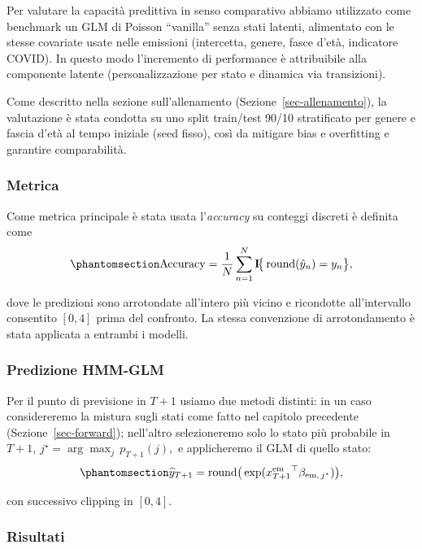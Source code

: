 \documentclass[
  italian,
  a4paper,
  a4paper,
  twoside,
  open=right,
  12pt]{scrbook}
\theoremstyle{definition}
\theoremstyle{remark}
\begin{document}
Per valutare la capacità predittiva in senso comparativo abbiamo
utilizzato come benchmark un GLM di Poisson ``vanilla'' senza stati
latenti, alimentato con le stesse covariate usate nelle emissioni
(intercetta, genere, fasce d'età, indicatore COVID). In questo modo
l'incremento di performance è attribuibile alla componente latente
(personalizzazione per stato e dinamica via transizioni).

Come descritto nella sezione sull'allenamento
(Sezione~\ref{sec-allenamento}), la valutazione è stata condotta su uno
split train/test 90/10 stratificato per genere e fascia d'età al tempo
iniziale (seed fisso), così da mitigare bias e overfitting e garantire
comparabilità.

\subsubsection{Metrica}\label{metrica}

Come metrica principale è stata usata l'\emph{accuracy} su conteggi
discreti è definita come
\begin{equation}\phantomsection\label{eq-accuracy}{
\mathrm{Accuracy} = \frac{1}{N}\sum_{n=1}^N \mathbf{I}\!\big\{\operatorname{round}(\hat y_n) = y_n\big\},
}\end{equation}

dove le predizioni sono arrotondate all'intero più vicino e ricondotte
all'intervallo consentito \([0,4]\) prima del confronto. La stessa
convenzione di arrotondamento è stata applicata a entrambi i modelli.

\subsubsection{Predizione HMM-GLM}\label{predizione-hmm-glm}

Per il punto di previsione in \(T{+}1\) usiamo due metodi distinti: in
un caso considereremo la mistura sugli stati come fatto nel capitolo
precedente (Sezione~\ref{sec-forward}); nell'altro selezioneremo solo lo
stato più probabile in \(T{+}1\), \(j^\star = \arg\max_j\, p_{T+1}(j),\)
e applicheremo il GLM di quello stato:
\begin{equation}\phantomsection\label{eq-pred_glm}{
\widehat y_{T+1} = \operatorname{round}\!\big(\exp(x^{\mathrm{em}}_{T+1}{}^\top \beta_{\mathrm{em},\,j^\star})\big),
}\end{equation}

con successivo clipping in \([0,4]\).

\subsubsection{Risultati}\label{risultati-4}
\end{document}
